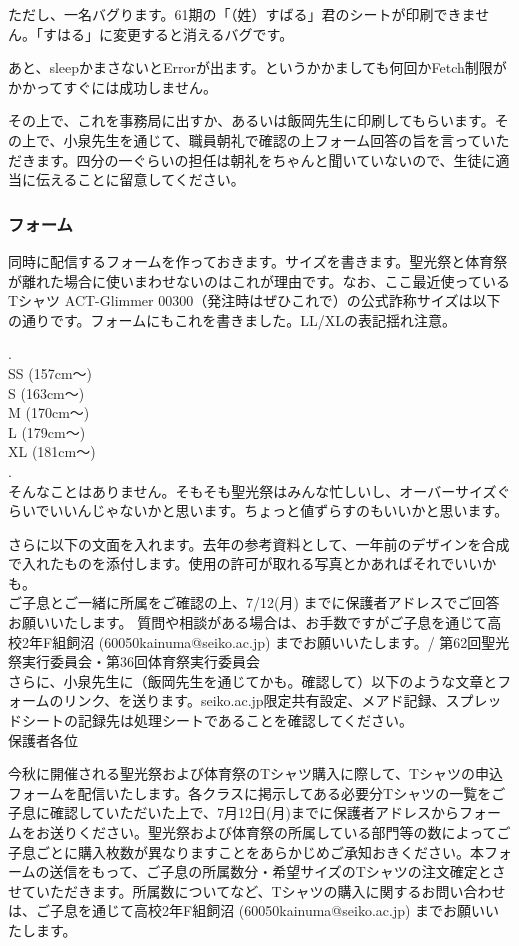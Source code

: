 \documentclass[a4paper]{ltjsreport}
\begin{document}
ただし、一名バグります。61期の「（姓）すばる」君のシートが印刷できません。「すはる」に変更すると消えるバグです。

あと、sleepかまさないとErrorが出ます。というかかましても何回かFetch制限がかかってすぐには成功しません。

その上で、これを事務局に出すか、あるいは飯岡先生に印刷してもらいます。その上で、小泉先生を通じて、職員朝礼で確認の上フォーム回答の旨を言っていただきます。四分の一ぐらいの担任は朝礼をちゃんと聞いていないので、生徒に適当に伝えることに留意してください。
\\
\subsubsection{フォーム}
同時に配信するフォームを作っておきます。サイズを書きます。聖光祭と体育祭が離れた場合に使いまわせないのはこれが理由です。なお、ここ最近使っているTシャツ ACT-Glimmer 00300（発注時はぜひこれで）の公式詐称サイズは以下の通りです。フォームにもこれを書きました。LL/XLの表記揺れ注意。

.\\
SS (157cm〜)\\
S (163cm〜)\\
M (170cm〜)\\
L (179cm〜)\\
XL (181cm〜)\\
.
\\

そんなことはありません。そもそも聖光祭はみんな忙しいし、オーバーサイズぐらいでいいんじゃないかと思います。ちょっと値ずらすのもいいかと思います。

さらに以下の文面を入れます。去年の参考資料として、一年前のデザインを合成で入れたものを添付します。使用の許可が取れる写真とかあればそれでいいかも。
\\

ご子息とご一緒に所属をご確認の上、7/12(月) までに保護者アドレスでご回答お願いいたします。
質問や相談がある場合は、お手数ですがご子息を通じて高校2年F組飼沼 (60050kainuma@seiko.ac.jp) までお願いいたします。/ 第62回聖光祭実行委員会・第36回体育祭実行委員会\\

さらに、小泉先生に（飯岡先生を通じてかも。確認して）以下のような文章とフォームのリンク、を送ります。seiko.ac.jp限定共有設定、メアド記録、スプレッドシートの記録先は処理シートであることを確認してください。\\

保護者各位

今秋に開催される聖光祭および体育祭のTシャツ購入に際して、Tシャツの申込フォームを配信いたします。各クラスに掲示してある必要分Tシャツの一覧をご子息に確認していただいた上で、7月12日(月)までに保護者アドレスからフォームをお送りください。聖光祭および体育祭の所属している部門等の数によってご子息ごとに購入枚数が異なりますことをあらかじめご承知おきください。本フォームの送信をもって、ご子息の所属数分・希望サイズのTシャツの注文確定とさせていただきます。所属数についてなど、Tシャツの購入に関するお問い合わせは、ご子息を通じて高校2年F組飼沼 (60050kainuma@seiko.ac.jp) までお願いいたします。
\end{document}
